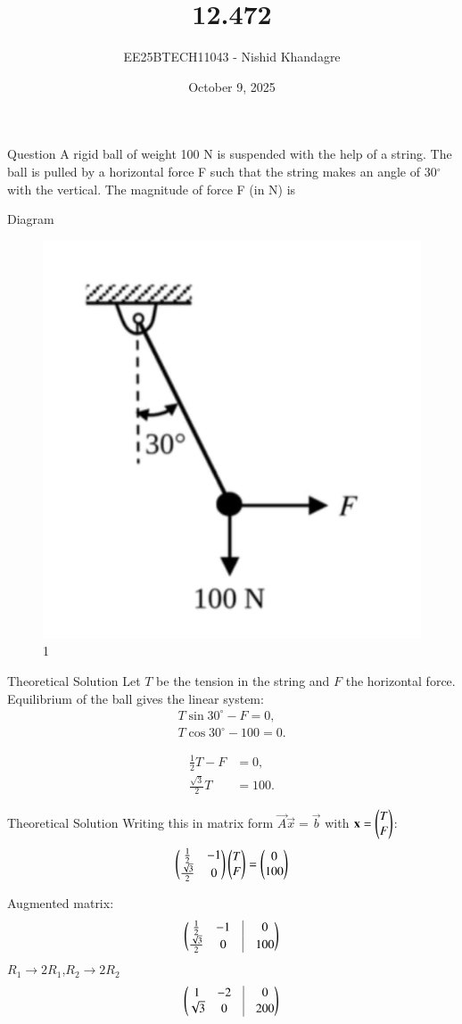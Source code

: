\documentclass{beamer}
\title
{12.472}
\date{October 9, 2025}
\author
{EE25BTECH11043 - Nishid Khandagre}
\begin{document}
\frame{\titlepage}

\begin{frame}{Question}
A rigid ball of weight 100 N is suspended with the help of a string. The ball is pulled by a horizontal force F such that the string makes an angle of 30$^\circ$ with the vertical. The magnitude of force F (in N) is
\end{frame}

\begin{frame}{Diagram}
\begin{figure}[H]
\centering
\includegraphics[width=0.4\columnwidth]{../figs/fig.jpg}
\caption{1}
\label{fig:fig}
\end{figure}
\end{frame}

\begin{frame}{Theoretical Solution}
Let $T$ be the tension in the string and $F$ the horizontal force.
Equilibrium of the ball gives the linear system:
\begin{align}
T\sin 30^\circ - F = 0, \\
T\cos 30^\circ - 100 = 0.
\end{align}

\begin{align}
\frac{1}{2}T - F &= 0, \\
\frac{\sqrt3}{2}T &= 100.
\end{align}
\end{frame}

\begin{frame}{Theoretical Solution}
Writing this in matrix form $\vec{A}\vec{x}=\vec{b}$ with $\mathbf{x}=\begin{pmatrix}T \\ F\end{pmatrix}$:
\begin{align}
\begin{pmatrix}
\frac12 & -1 \\
\frac{\sqrt3}{2} & 0
\end{pmatrix}
\begin{pmatrix}T \\ F\end{pmatrix}
=
\begin{pmatrix}0 \\ 100\end{pmatrix}
\end{align}

Augmented matrix:
\begin{align}
\myvec{
\frac12 & -1 & \vrule & 0 \\
\frac{\sqrt3}{2} & 0 & \vrule & 100
}
\end{align}
$R_1 \rightarrow 2R_1$,$R_2 \rightarrow 2R_2$
\begin{align}
\myvec{
1 & -2 & \vrule & 0 \\
\sqrt3 & 0 & \vrule & 200
}
\end{align}
\end{frame}
\end{document}
